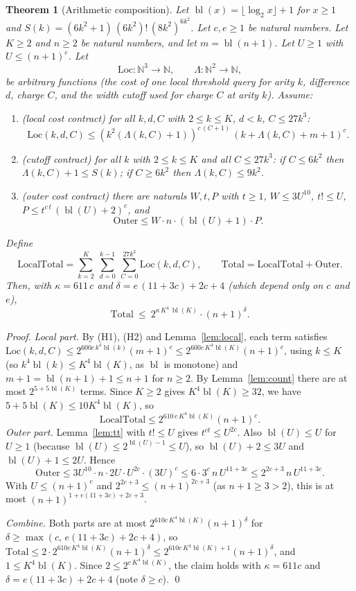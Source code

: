 \documentclass[11pt]{article}
\newtheorem{theorem}{Theorem}
\newcommand{\N}{\mathbb N}
\newcommand{\bl}{\operatorname{bl}}
\begin{document}
\begin{theorem}[Arithmetic composition]\label{thm:comp}
Let $\bl(x)=\lfloor\log_2x\rfloor+1$ for $x\ge1$ and $S(k)=(6k^2+1)\,(6k^2)!\,(8k^2)^{6k^2}$. Let $c,e\ge1$ be natural numbers. Let $K\ge2$ and $n\ge2$ be natural numbers, and let $m=\bl(n+1)$. Let $U\ge1$ with $U\le(n+1)^{e}$. Let
\[
\mathrm{Loc}:\N^3\to\N,\qquad\Lambda:\N^2\to\N,
\]
be arbitrary functions (the cost of one local threshold query for arity $k$, difference $d$, charge $C$, and the width cutoff used for charge $C$ at arity $k$). Assume:

\begin{enumerate}
\item[(H1)] (\emph{local cost contract}) for all $k,d,C$ with $2\le k\le K$, $d<k$, $C\le27k^3$:
\[
\mathrm{Loc}(k,d,C)\le(k^2(\Lambda(k,C)+1))^{c\,(C+1)}\,(k+\Lambda(k,C)+m+1)^{c}.
\]
\item[(H2)] (\emph{cutoff contract}) for all $k$ with $2\le k\le K$ and all $C\le 27k^3$: if $C\le6k^2$ then $\Lambda(k,C)+1\le S(k)$; if $C\ge6k^2$ then $\Lambda(k,C)\le9k^2$.
\item[(H3)] (\emph{outer cost contract}) there are naturals $W,t,P$ with $t\ge1$, $W\le3U^{10}$, $t!\le U$, $P\le t^{c\,t}\,(\bl(U)+2)^{c}$, and
\[
\mathrm{Outer}\le W\cdot n\cdot(\bl(U)+1)\cdot P .
\]
\end{enumerate}
Define
\[
\mathrm{LocalTotal}=\sum_{k=2}^{K}\ \sum_{d=0}^{k-1}\ \sum_{C=0}^{27k^3}\mathrm{Loc}(k,d,C),\qquad \mathrm{Total}=\mathrm{LocalTotal}+\mathrm{Outer}.
\]
Then, with $\kappa=611\,c$ and $\delta=e\,(11+3c)+2c+4$ (which depend only on $c$ and $e$),
\[
\mathrm{Total}\ \le\ 2^{\kappa\,K^4\,\bl(K)}\cdot(n+1)^{\delta}.
\]
\end{theorem}
\begin{proof}
\emph{Local part.} By (H1), (H2) and Lemma~\ref{lem:local}, each term satisfies $\mathrm{Loc}(k,d,C)\le2^{600c\,k^4\bl(k)}(m+1)^c\le2^{600c\,K^4\bl(K)}(n+1)^c$, using $k\le K$ (so $k^4\bl(k)\le K^4\bl(K)$, as $\bl$ is monotone) and $m+1=\bl(n+1)+1\le n+1$ for $n\ge2$. By Lemma~\ref{lem:count} there are at most $2^{5+5\bl(K)}$ terms. Since $K\ge2$ gives $K^4\bl(K)\ge 32$, we have $5+5\bl(K)\le 10K^4\bl(K)$, so
\[
\mathrm{LocalTotal}\le2^{610\,c\,K^4\bl(K)}(n+1)^c.
\]
\emph{Outer part.} Lemma~\ref{lem:tt} with $t!\le U$ gives $t^{ct}\le U^{2c}$. Also $\bl(U)\le U$ for $U\ge1$ (because $\bl(U)\le2^{\bl(U)-1}\le U$), so $\bl(U)+2\le3U$ and $\bl(U)+1\le2U$. Hence
\[
\mathrm{Outer}\le3U^{10}\cdot n\cdot2U\cdot U^{2c}\cdot(3U)^c\le 6\cdot 3^{c}\,n\,U^{11+3c}\le 2^{2c+3}\,n\,U^{11+3c}.
\]
With $U\le(n+1)^e$ and $2^{2c+3}\le (n+1)^{2c+3}$ (as $n+1\ge3>2$), this is at most $(n+1)^{1+e(11+3c)+2c+3}$.

\emph{Combine.} Both parts are at most $2^{610c\,K^4\bl(K)}(n+1)^{\delta}$ for $\delta\ge\max(c,\,e(11+3c)+2c+4)$, so $\mathrm{Total}\le2\cdot2^{610c\,K^4\bl(K)}(n+1)^{\delta}\le2^{610c\,K^4\bl(K)+1}(n+1)^\delta$, and $1\le K^4\bl(K)$. Since $2\le2^{c\,K^4\bl(K)}$, the claim holds with $\kappa=611c$ and $\delta=e(11+3c)+2c+4$ (note $\delta\ge c$). \qed
\end{proof}
\end{document}
